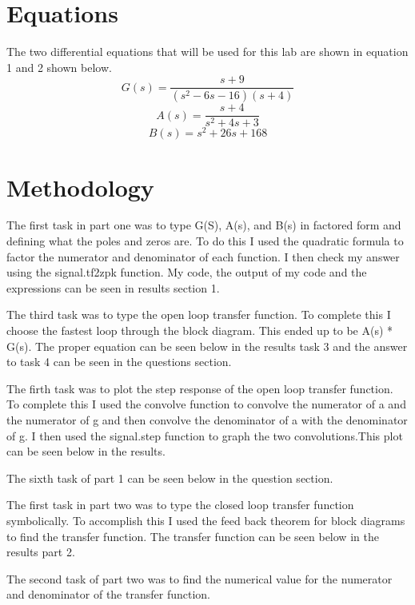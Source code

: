 \documentclass[11pt,a4]{report}
\begin{document}
\section{Equations}
The two differential equations that will be used for this lab are shown in equation 1 and 2 shown below. 
\begin{equation}
    G(s) = \frac{s+9}{(s^2-6s-16)(s+4)}
\end{equation}
\begin{equation}
    A(s) = \frac{s+4}{s^2+4s+3}
\end{equation}
\begin{equation}
  B(s) = s^2+26s+168
\end{equation}


\section{Methodology}
The first task in part one was to type G(S), A(s), and B(s) in factored form and defining what the poles and zeros are. To do this I used the quadratic formula to factor the numerator and denominator of each function. I then check my answer using the signal.tf2zpk function. My code, the output of my code and the expressions can be seen in results section 1. 

The third task was to type the open loop transfer function. To complete this I choose the fastest loop through the block diagram. This ended up to be A(s) * G(s). The proper equation can be seen below in the results task 3 and the answer to task 4 can be seen in the questions section. 

The firth task was to plot the step response of the open loop transfer function. To complete this I used the convolve function to convolve the numerator of a and the numerator of g and then convolve the denominator of a with the denominator of g. I then used the signal.step function to graph the two convolutions.This plot can be seen below in the results. 

The sixth task of part 1 can be seen below in the question section.

The first task in part two was to type the closed loop transfer function symbolically. To accomplish this I used the feed back theorem for block diagrams to find the transfer function. The transfer function can be seen below in the results part 2. 

The second task of part two was to find the numerical value for the numerator and denominator of the transfer function. 
\end{document}
